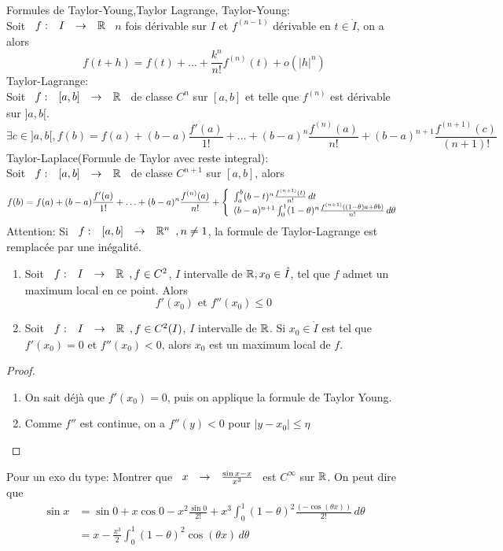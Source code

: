 \documentclass[]{report}
\begin{document}
\begin{df}{Formules de Taylor-Young,Taylor Lagrange,}{}
    Taylor-Young:\\
    Soit $\begin{array}{ccccc} f : & I & \to & \mathbb{R} \end{array}$ $n$ fois dérivable sur $I$ et $f^{(n-1)}$ dérivable en $t\in \mathring{I}$, on a alors
    \[f(t+h)=f(t)+\ldots+\frac{k^n}{n!}f^{(n)}(t)+ o(|h|^n)\]
    Taylor-Lagrange:\\
    Soit $\begin{array}{ccccc} f : & [a,b] & \to & \mathbb{R} \end{array}$ de classe $C^n$ sur $[a,b]$ et telle que $f^{(n)}$ est dérivable sur $]a,b[$.
    \[\exists c\in ]a,b[, f(b)=f(a)+(b-a)\frac{f'(a)}{1!}+\ldots+ (b-a)^n\frac{f^{(n)}(a)}{n!}+ (b-a)^{n+1}\frac{f^{(n+1)}(c)}{(n+1)!}\]
    Taylor-Laplace(Formule de Taylor avec reste integral):\\
    Soit $\begin{array}{ccccc} f : & [a,b] & \to & \mathbb{R} \end{array}$ de classe $C^{n+1}$ sur $[a,b]$, alors
    \[f(b)=f(a)+(b-a)\frac{f'(a)}{1!}+\ldots+ (b-a)^n \frac{f^{(n)}(a)}{n!}+\left\{\begin{array}{ll} \int_a^b (b-t)^n \frac{f^{(n+1)}(t)}{n!}\, dt\\ (b-a)^{n+1} \int_{0}^{1}(1-\theta)^n\frac{f^{(n+1)} \left((1-\theta)a+\theta b\right)}{n!} \, d\theta \end{array} \right.\]
    Attention: Si $\begin{array}{ccccc} f : & [a,b] & \to & \mathbb{R}^n \end{array},n\neq 1$, la formule de Taylor-Lagrange est remplacée par une inégalité.
\end{df}

\begin{prop}{}{}
    \begin{enumerate}
        \item Soit $\begin{array}{ccccc} f : & I & \to & \mathbb{R} \end{array}, f\in C^2$, $I$ intervalle de $\mathbb{R},x_0\in \mathring{I}$, tel que $f$ admet un maximum local en ce point. Alors
        \[f'(x_0)\text{ et }f''(x_0)\le 0\] 
        \item Soit $\begin{array}{ccccc} f : & I & \to & \mathbb{R} \end{array},f\in C^2(I)$, $I$ intervalle de $\mathbb{R}$. Si $x_0\in \mathring{I}$ est tel que $f'(x_0)=0$ et $f''(x_0)<0$, alors $x_0$ est un maximum local de $f$.
    \end{enumerate}
\end{prop}

\begin{proof}
    \begin{enumerate}
        \item On sait déjà que $f'(x_0)=0$, puis on applique la formule de Taylor Young.
        \item Comme $f''$ est continue, on a $f''(y)<0$ pour $|y-x_0|\le \eta$
    \end{enumerate}
\end{proof}

\begin{re}{}{}
    Pour un exo du type: Montrer que $\begin{array}{ccccc} x & \to & \frac{\sin x-x}{ x^3} \end{array}$ est $C^\infty$ sur $\mathbb{R}$. On peut dire que 
    \begin{align*}
        \sin x &= \sin 0 +x\cos 0 - x^2\frac{\sin 0}{2!}+x^3 \int_0^1 (1-\theta)^2 \frac{\left(-\cos (\theta x)\right)}{2!}\, d\theta\\
        &= x-\frac{x^3}{2}\int_{0}^{1}(1-\theta)^2 \cos (\theta x)\, d\theta
    \end{align*}
\end{re}
\end{document}
